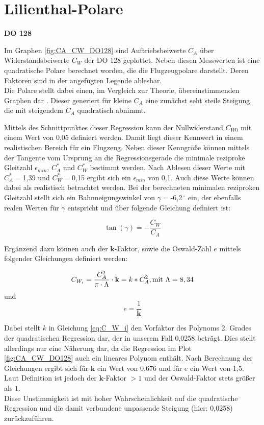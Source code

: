 \section{Lilienthal-Polare}

\textbf{DO 128}

Im Graphen \ref{fig:CA_CW_DO128} sind  Auftriebsbeiwerte $C_A$ über Widerstandsbeiwerte $C_W$ der DO 128 geplottet. Neben diesen Messwerten ist eine quadratische Polare berechnet worden, die die Flugzeugpolare darstellt. Deren Faktoren sind in der angefügten Legende ablesbar. \\ Die Polare stellt dabei einen, im Vergleich zur Theorie, übereinstimmenden Graphen dar \cite{Kurzskript}. Dieser generiert für kleine $C_A$ eine zunächst seht steile Steigung, die mit steigendem $C_A$ quadratisch abnimmt. 

Mittels des Schnittpunktes dieser Regression kann der Nullwiderstand $C_{W0}$ mit einem Wert von 0,05 definiert werden. Damit liegt dieser Kennwert in einem realistischen Bereich für ein Flugzeug. Neben dieser Kenngröße können mittels der Tangente vom Ursprung an die Regressionsgerade die minimale reziproke Gleitzahl $\epsilon_{min}$, $C_A^*$ und $C_W^*$ bestimmt werden. Nach Ablesen dieser Werte mit $C_A^*=$1,39 und $C_W^*=$0,15 ergibt sich ein $\epsilon_{min}$ von 0,1. Auch diese Werte können dabei als realistisch betrachtet werden. Bei der berechneten minimalen reziproken Gleitzahl stellt sich ein Bahnneigungswinkel von $\gamma=$-6,2$^{\ \circ}$ ein, der ebenfalls realen Werten für $\gamma$ entspricht und über folgende Gleichung definiert ist:

\begin{equation}
\tan\left(\gamma\right)=-\frac{C_W}{C_A}
\end{equation}

Ergänzend dazu können auch der $\textbf{k}$-Faktor, sowie die Oswald-Zahl $e$ mittels folgender Gleichungen definiert werden:

\begin{equation}
C_{W_{i}}=\frac{C_A^2}{\pi \cdot \Lambda}\cdot \textbf{k}=k*C_A^2, \\ \mathrm{mit} \ \Lambda=8,34 
\label{eq:C_W_i}
\end{equation}
und
\begin{equation}
e=\frac{1}{\textbf{k}}
\end{equation}

Dabei stellt $k$ in Gleichung \ref{eq:C_W_i} den Vorfaktor des Polynoms 2. Grades der quadratischen Regression dar, der in unserem Fall 0,0258 beträgt. Dies stellt allerdings nur eine Näherung dar, da die Regression im Plot \ref{fig:CA_CW_DO128} auch ein lineares Polynom enthält. Nach Berechnung der Gleichungen ergibt sich für $\textbf{k}$ ein Wert von 0,676 und für $e$ ein Wert von 1,5. 
Laut Definition ist jedoch der $\textbf{k}$-Faktor $>1$ und der Oswald-Faktor stets größer als $1$. \\
Diese Unstimmigkeit ist mit hoher Wahrscheinlichkeit auf die quadratische Regression und die damit verbundene unpassende Steigung (hier: 0,0258) zurückzuführen.

